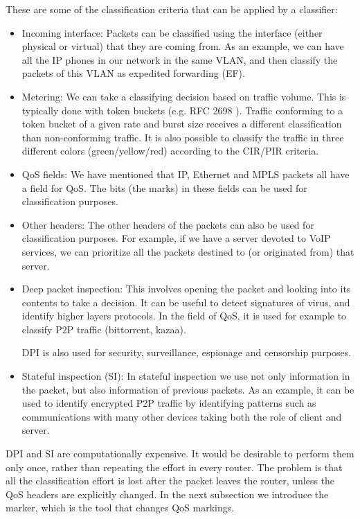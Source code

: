 These are some of the classification criteria that can be applied by a classifier:
\begin{itemize}
\item Incoming interface: Packets can be classified using the interface (either physical or virtual) that they are coming from.
As an example, we can have all the IP phones in our network in the same VLAN, and then classify the packets of this VLAN as expedited forwarding (EF).

\item Metering: We can take a classifying decision based on traffic volume.
This is typically done with token buckets (e.g. RFC 2698 \cite{rfc2698}).
Traffic conforming to a token bucket of a given rate and burst size receives a different classification than non-conforming traffic.
It is also possible to classify the traffic in three different colors (green/yellow/red) according to the CIR/PIR criteria.

\item QoS fields: We have mentioned that IP, Ethernet and MPLS packets all have a field for QoS.
The bits (the marks) in these fields can be used for classification purposes.

\item Other headers: The other headers of the packets can also be used for classification purposes.
For example, if we have a server devoted to VoIP services, we can prioritize all the packets destined to (or originated from) that server.

\item Deep packet inspection: This involves opening the packet and looking into its contents to take a decision.
It can be useful to detect signatures of virus, and identify higher layers protocols.
In the field of QoS, it is used for example to classify P2P traffic (bittorrent, kazaa).

DPI is also used for security, surveillance, espionage and censorship purposes.

\item Stateful inspection (SI): In stateful inspection we use not only information in the packet, but also information of previous packets.
As an example, it can be used to identify encrypted P2P traffic by identifying patterns such as communications with many other devices taking both the role of client and server.
\end{itemize}

DPI and SI are computationally expensive.
It would be desirable to perform them only once, rather than repeating the effort in every router.
The problem is that all the classification effort is lost after the packet leaves the router, unless the QoS headers are explicitly changed.
In the next subsection we introduce the marker, which is the tool that changes QoS markings.

